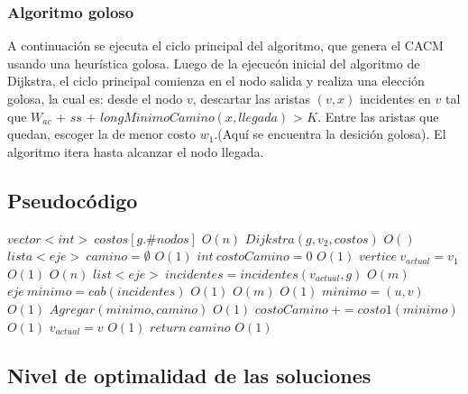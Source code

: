 \subsubsection{Algoritmo goloso}

A continuaci\'on se ejecuta el ciclo principal del algoritmo, que genera el CACM usando una heur\'istica golosa. Luego de la ejecuc\'on inicial del algoritmo de Dijkstra, el ciclo principal comienza en el nodo salida y realiza una elecci\'on golosa, la cual es: desde el nodo $v$, descartar las aristas $(v,x)$ incidentes en $v$ tal que $W_{ac}$ + $ss$ + $longMinimoCamino(x,llegada)$ > $K$. Entre las aristas que quedan, escoger la de menor costo $w_1$.(Aqu\'i se encuentra la desici\'on golosa). El algoritmo itera hasta alcanzar el nodo llegada.

\subsection{Pseudoc\'odigo}

\begin{algorithmic}


\State $vector<int> \: costos[g.\#nodos]$
\Comment $ O(n) $
\State $ Dijkstra( g, v_2, costos) $
\Comment $ O() $
\State $lista<eje> \: camino= \emptyset$
\Comment $ O(1) $
\State $ int \: costoCamino = 0 $
\Comment $ O(1) $
\State $ vertice \: v_{actual} = v_1 $
\Comment $ O(1) $
\Comment $ O(n) $
	\State $ list<eje> \: incidentes = incidentes(v_{actual}, g) $
	\Comment $ O(m) $
	\State $ eje \:	 minimo = cab(incidentes) $
	\Comment $ O(1)$
	\Comment $ O(m) $
		\Comment $ O(1) $
			\State $ minimo = (u,v) $
			\Comment $ O(1) $
		\EndIf
	\EndFor
	\State $ Agregar(minimo, camino) $
	\Comment $ O(1) $
	\State $ costoCamino \: += costo1(minimo) $
	\Comment $ O(1) $
	\State $ v_{actual} = v $
	\Comment $ O(1) $
\EndWhile
\State $ return \: camino $
\Comment $ O(1) $

\EndProcedure

\end{algorithmic}


\subsection{Nivel de optimalidad de las soluciones}

